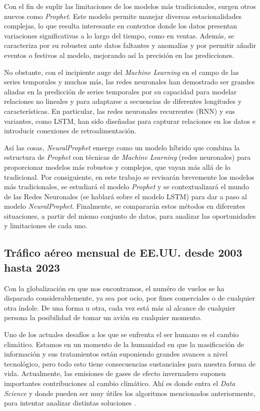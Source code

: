 \documentclass[12pt,twoside]{article}
\begin{document}
Con el fin de suplir las limitaciones de los modelos más tradicionales, surgen otros nuevos como \textit{Prophet}. Este modelo permite manejar diversas estacionalidades complejas, lo que resulta interesante en contextos donde los datos presentan variaciones significativas a lo largo del tiempo, como en ventas. Además, se caracteriza por su robustez ante datos faltantes y anomalías y por permitir añadir eventos o festivos al modelo, mejorando así la precisión en las predicciones. 

No obstante, con el incipiente auge del \textit{Machine Learning} en el campo de las series temporales y muchos más, las redes neuronales han demostrado ser grandes aliadas en la predicción de series temporales por su capacidad para modelar relaciones no lineales y para adaptarse a secuencias de diferentes longitudes y características. En particular, las redes neuronales recurrentes (RNN) y sus variantes, como LSTM, han sido diseñadas para capturar relaciones en los datos e introducir conexiones de retroalimentación.

Así las cosas, \textit{NeuralProphet} emerge como un modelo híbrido que combina la estructura de \textit{Prophet} con técnicas de \textit{Machine Learning} (redes neuronales) para proporcionar modelos más robustos y complejos, que vayan más allá de lo tradicional. Por consiguiente, en este trabajo se revisarán brevemente los modelos más tradicionales, se estudiará el modelo \textit{Prophet} y se contextualizará el mundo de las Redes Neuronales (se hablará sobre el modelo LSTM) para dar a paso al modelo \textit{NeuralProphet}. Finalmente, se compararán estos métodos en diferentes situaciones, a partir del mismo conjunto de datos, para analizar las oportunidades y limitaciones de cada uno.

\subsection{Tráfico aéreo mensual de EE.UU. desde 2003 hasta 2023} \label{sec:2}

Con la globalización en que nos encontramos, el numéro de vuelos se ha disparado considerablemente, ya sea por ocio, por fines comerciales o de cualquier otra índole. De una forma u otra, cada vez está más al alcance de cualquier persona la posibilidad de tomar un avión en cualquier momento. 

Uno de los actuales desafíos a los que se enfrenta el ser humano es el cambio climático. Estamos en un momento de la humanidad en que la masificación de información y sus tratamientos están suponiendo grandes avances a nivel tecnológico, pero todo esto tiene consecuencias sustanciales para nuestra forma de vida. Actualmente, las emisiones de gases de efecto invernadero suponen importantes contribuciones al cambio climático. Ahí es donde entra el \textit{Data Science} y donde pueden ser muy útiles los algoritmos mencionados anteriormente, para intentar analizar distintas soluciones .
\end{document}
